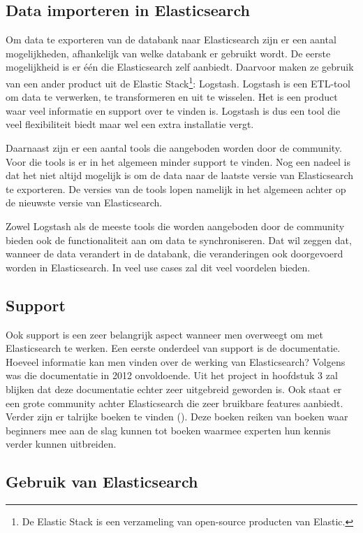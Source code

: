 \subsection{Data importeren in Elasticsearch}

Om data te exporteren van de databank naar Elasticsearch zijn er een aantal mogelijkheden, afhankelijk van welke databank er gebruikt wordt. De eerste mogelijkheid is er één die Elasticsearch zelf aanbiedt. Daarvoor maken ze gebruik van een ander product uit de Elastic Stack\footnote{De Elastic Stack is een verzameling van open-source producten van Elastic.}: Logstash. Logstash is een ETL-tool om data te verwerken, te transformeren en uit te wisselen. Het is een product waar veel informatie en support over te vinden is. Logstash is dus een tool die veel flexibiliteit biedt maar wel een extra installatie vergt. 

Daarnaast zijn er een aantal tools die aangeboden worden door de community. Voor die tools is er in het algemeen minder support te vinden. Nog een nadeel is dat het niet altijd mogelijk is om de data naar de laatste versie van Elasticsearch te exporteren. De versies van de tools lopen namelijk in het algemeen achter op de nieuwste versie van Elasticsearch. 

Zowel Logstash als de meeste tools die worden aangeboden door de community bieden ook de functionaliteit aan om data te synchroniseren. Dat wil zeggen dat, wanneer de data verandert in de databank, die veranderingen ook doorgevoerd worden in Elasticsearch. In veel use cases zal dit veel voordelen bieden. 

\subsection{Support}

Ook support is een zeer belangrijk aspect wanneer men overweegt om met Elasticsearch te werken. Een eerste onderdeel van support is de documentatie. Hoeveel informatie kan men vinden over de werking van Elasticsearch? Volgens \textcite{Glauner2012} was die documentatie in 2012 onvoldoende. Uit het project in hoofdstuk 3 zal blijken dat deze documentatie echter zeer uitgebreid geworden is. Ook staat er een grote community achter Elasticsearch die zeer bruikbare features aanbiedt. Verder zijn er talrijke boeken te vinden (\textcite{Turner}). Deze boeken reiken van boeken waar beginners mee aan de slag kunnen tot boeken waarmee experten hun kennis verder kunnen uitbreiden.

\subsection{Gebruik van Elasticsearch}

